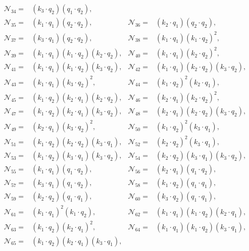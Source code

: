 \documentclass[twocolumn,aps,showpacs,nofootinbib,superscriptaddress,prd]{revtex4-2}
\begin{document}
\begin{widetext}
\begin{align}
{\mathcal N}_{34}=&(k_3\cdot q_2) (q_1\cdot q_2),\nonumber\\
{\mathcal N}_{35}=&(k_1\cdot q_1) (q_2\cdot q_2),&
{\mathcal N}_{36}=&(k_2\cdot q_1) (q_2\cdot q_2),\nonumber\\
{\mathcal N}_{37}=&(k_3\cdot q_1) (q_2\cdot q_2),&
{\mathcal N}_{38}=&(k_1\cdot q_1) (k_1\cdot q_2)^2,\nonumber\\
{\mathcal N}_{39}=&(k_1\cdot q_1) (k_1\cdot q_2) (k_2\cdot q_2),&
{\mathcal N}_{40}=&(k_1\cdot q_1) (k_2\cdot q_2)^2,\nonumber\\
{\mathcal N}_{41}=&(k_1\cdot q_1) (k_1\cdot q_2) (k_3\cdot q_2),&
{\mathcal N}_{42}=&(k_1\cdot q_1) (k_2\cdot q_2) (k_3\cdot q_2),\nonumber\\
{\mathcal N}_{43}=&(k_1\cdot q_1) (k_3\cdot q_2)^2,&
{\mathcal N}_{44}=&(k_1\cdot q_2)^2 (k_2\cdot q_1),\nonumber\\
{\mathcal N}_{45}=&(k_1\cdot q_2) (k_2\cdot q_1) (k_2\cdot q_2),&
{\mathcal N}_{46}=&(k_2\cdot q_1) (k_2\cdot q_2)^2,\nonumber\\
{\mathcal N}_{47}=&(k_1\cdot q_2) (k_2\cdot q_1) (k_3\cdot q_2),&
{\mathcal N}_{48}=&(k_2\cdot q_1) (k_2\cdot q_2) (k_3\cdot q_2),\nonumber\\
{\mathcal N}_{49}=&(k_2\cdot q_1) (k_3\cdot q_2)^2,&
{\mathcal N}_{50}=&(k_1\cdot q_2)^2 (k_3\cdot q_1),\nonumber\\
{\mathcal N}_{51}=&(k_1\cdot q_2) (k_2\cdot q_2) (k_3\cdot q_1),&
{\mathcal N}_{52}=&(k_2\cdot q_2)^2 (k_3\cdot q_1),\nonumber\\
{\mathcal N}_{53}=&(k_1\cdot q_2) (k_3\cdot q_1) (k_3\cdot q_2),&
{\mathcal N}_{54}=&(k_2\cdot q_2) (k_3\cdot q_1) (k_3\cdot q_2),\nonumber\\
{\mathcal N}_{55}=&(k_1\cdot q_1) (q_1\cdot q_2),&
{\mathcal N}_{56}=&(k_2\cdot q_1) (q_1\cdot q_2),\nonumber\\
{\mathcal N}_{57}=&(k_3\cdot q_1) (q_1\cdot q_2),&
{\mathcal N}_{58}=&(k_1\cdot q_2) (q_1\cdot q_1),\nonumber\\
{\mathcal N}_{59}=&(k_2\cdot q_2) (q_1\cdot q_1),&
{\mathcal N}_{60}=&(k_3\cdot q_2) (q_1\cdot q_1),\nonumber\\
{\mathcal N}_{61}=&(k_1\cdot q_1)^2 (k_1\cdot q_2),&
{\mathcal N}_{62}=&(k_1\cdot q_1) (k_1\cdot q_2) (k_2\cdot q_1),\nonumber\\
{\mathcal N}_{63}=&(k_1\cdot q_2) (k_2\cdot q_1)^2,&
{\mathcal N}_{64}=&(k_1\cdot q_1) (k_1\cdot q_2) (k_3\cdot q_1),\nonumber\\
{\mathcal N}_{65}=&(k_1\cdot q_2) (k_2\cdot q_1) (k_3\cdot q_1),&

\end{align}
\end{widetext}
\end{document}
